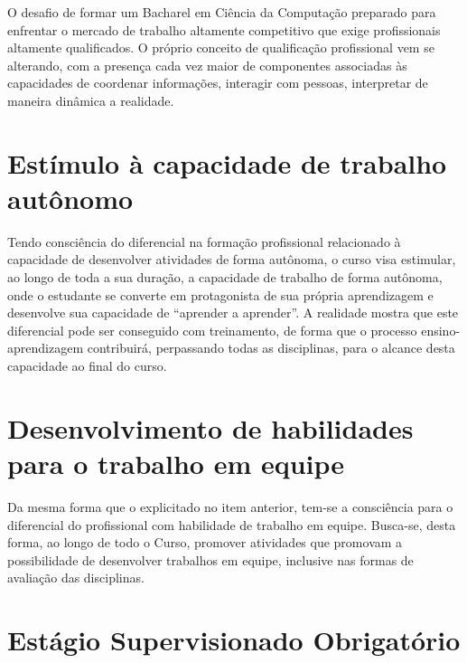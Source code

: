\documentclass[
	12pt,				%
	openright,			%
  oneside,     %
	a4paper,			%
	english,			%
	french,				%
	spanish,			%
	brazil				%
	]{abntex2}
\begin{document}
O desafio de formar um Bacharel em Ciência  da Computação preparado para
enfrentar o mercado de trabalho altamente  competitivo que exige profissionais
altamente qualificados. O próprio conceito  de qualificação profissional vem se
alterando, com a presença cada vez maior de  componentes associadas às
capacidades de coordenar informações, interagir  com pessoas, interpretar de
maneira dinâmica a realidade.

\section{Estímulo à capacidade de trabalho autônomo}

Tendo consciência do diferencial na formação  profissional relacionado à
capacidade de desenvolver atividades de forma  autônoma, o curso visa estimular,
ao longo de toda a sua duração, a capacidade de  trabalho de forma autônoma,
onde o estudante se converte em protagonista de  sua própria aprendizagem e
desenvolve sua capacidade de ``aprender a aprender''.  A realidade mostra que
este diferencial pode ser conseguido com treinamento, de forma que o processo
ensino-aprendizagem contribuirá, perpassando todas as disciplinas, para o
alcance desta capacidade ao final do curso.

\section{Desenvolvimento de habilidades para o trabalho em equipe}

Da mesma forma que o  explicitado no item anterior, tem-se a consciência para o
diferencial do profissional com  habilidade de trabalho em equipe. Busca-se,
desta forma, ao longo de todo o  Curso, promover atividades que promovam a
possibilidade de desenvolver trabalhos  em equipe, inclusive nas formas de
avaliação das disciplinas.

%
%

\section{Estágio Supervisionado Obrigatório}
\label{cap_eso}
\end{document}
